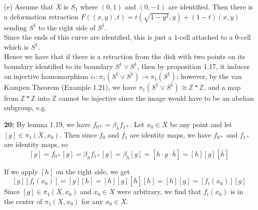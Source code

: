 \documentclass[a4paper]{article}
\begin{document}
     \linebreak
     (e) Assume that $X$ is $S_1$ where $(0,1)$ and $(0,-1)$ are identified.
     Then there is a deformation retraction 
     $F((x,y),t) = t(\sqrt{1 - y^2} , y) + (1-t) \left( x,y \right) $ sending
     $S^{1}$ to the right side of $S^{1}$.\\ 
     Since the ends of this curve are identified, this is just a $1$-cell
     attached to a $0$-cell which is $S^{1}$.\\
     \linebreak
     Hence we have that if there is a retraction from the disk with two points
     on its boundary identified to its boundary $S^{1} \lor S^{1}$, then
     by proposition 1.17, it induces an injective homomorphism
     $i_*  \colon \pi_1 \left( S^{1} \lor S^{1} \right) \to \pi_1 \left( S^{1}
     \right) $; however, by the van Kampen Theorem (Example 1.21), we have
     $\pi_1 \left( S^{1} \lor S^{1} \right) \cong \mathbb{Z} * \mathbb{Z}$, and
     a map from $\mathbb{Z} * \mathbb{Z}$ into $\mathbb{Z}$ cannot be
     injective since the image would have to be an abelian subgroup, e.g.\\
     \linebreak
     
     
     

 
\textbf{20:} By lemma 1.19, we have $f_{0*} = \beta_h f_{1*}$. Let $x_0 \in X$
be any point and let $\left[ g \right]  \in \pi_1 \left( X, x_0 \right) $. Then
since $f_0$ and $f_1$ are identity maps, we have $f_{0*}$ and $f_{1*}$ are
identity maps, so
\[
\left[ g \right] = f_{0*} \left[ g \right] = \beta_h f_{1*}\left[ g \right] 
= \beta_h \left[ g \right] = \left[ h \cdot g \cdot \overline{h} \right]
= \left[ h \right] \left[ g \right] \left[ \overline{h} \right]
\] 

If we apply $\left[ h \right] $ on the right side, we get
\[
\left[ g \right] \left[ f_t(x_0) \right]
= \left[ g \right] \left[ h \right] = \left[ h \right] \left[ g \right] 
\left[ \overline{h} \right] \left[ h \right] 
= \left[ h \right] \left[ g \right] = \left[ f_t(x_0) \right] \left[ g \right] 
\] 
Since $\left[ g \right] \in \pi_1 \left( X, x_0 \right) $ and $x_0 \in X$ were
arbitrary,
we find that $f_t(x_0)$ is in the center of $\pi_1 \left( X, x_0 \right) $ for
any $x_0 \in X$.
\end{document}
